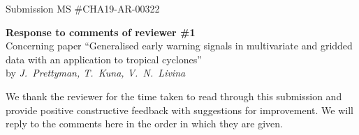 \documentclass[12pt]{article}
\begin{document}
Submission MS \#CHA19-AR-00322


\begin{center}
{\bf Response to comments of reviewer \#1}\\
\vspace{2mm}
Concerning paper ``Generalised early warning
signals in multivariate and gridded data with an application to
tropical cyclones''\\[5pt]
by {\it J.~Prettyman, T.~Kuna, V.~N.~Livina}
\end{center}

\vspace{3mm}

We thank the reviewer for the time taken to read through this submission and provide positive constructive feedback with suggestions for improvement. We will reply to the comments here in the order in which they are given.
\end{document}
